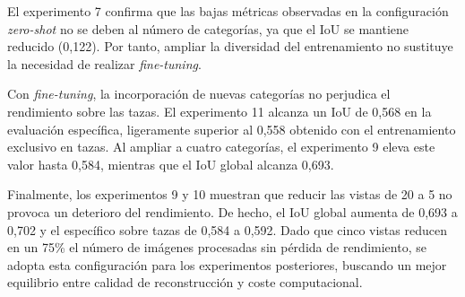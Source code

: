 \documentclass[10pt,a4paper]{report}
\begin{document}
\begin{table}[H]
  \centering
  \caption{Resultados de los experimentos 7, 9, 10 y 11 para diferentes configuraciones de entrenamiento.}
  \label{tab:tabla_resultados_categorias_1}
\end{table}

El experimento 7 confirma que las bajas métricas observadas en la configuración \textit{zero-shot} no se deben al número de categorías, ya que el IoU se mantiene reducido (0,122). Por tanto, ampliar la diversidad del entrenamiento no sustituye la necesidad de realizar \textit{fine-tuning}.

Con \textit{fine-tuning}, la incorporación de nuevas categorías no perjudica el rendimiento sobre las tazas. El experimento 11 alcanza un IoU de 0,568 en la evaluación específica, ligeramente superior al 0,558 obtenido con el entrenamiento exclusivo en tazas. Al ampliar a cuatro categorías, el experimento 9 eleva este valor hasta 0,584, mientras que el IoU global alcanza 0,693.

Finalmente, los experimentos 9 y 10 muestran que reducir las vistas de 20 a 5 no provoca un deterioro del rendimiento. De hecho, el IoU global aumenta de 0,693 a 0,702 y el específico sobre tazas de 0,584 a 0,592. Dado que cinco vistas reducen en un 75\% el número de imágenes procesadas sin pérdida de rendimiento, se adopta esta configuración para los experimentos posteriores, buscando un mejor equilibrio entre calidad de reconstrucción y coste computacional.
\end{document}
